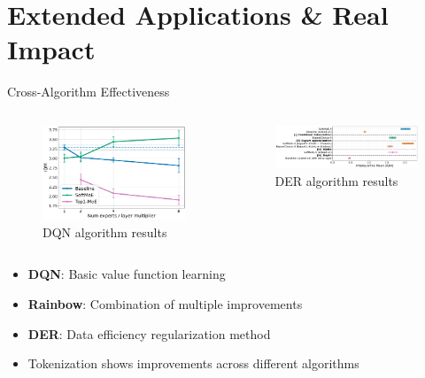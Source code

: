\documentclass{beamer}
\begin{document}
\section{Extended Applications \& Real Impact}

\begin{frame}{Cross-Algorithm Effectiveness}
  \begin{columns}[T]
    \begin{column}{0.5\textwidth}
      \begin{figure}
        \centering
        \includegraphics[width=\textwidth]{Mixtures_of_Experts_Unlock Parameter_Scaling_for_Deep_RL/figures/dqnToplinePlot.pdf}
        \caption{DQN algorithm results}
      \end{figure}
    \end{column}
    \begin{column}{0.5\textwidth}
      \begin{figure}
        \centering
        \includegraphics[width=\textwidth]{Don_t_flatten_tokenize/figures/results/section4_DER_aggregate_v2.pdf}
        \caption{DER algorithm results}
      \end{figure}
    \end{column}
  \end{columns}
  
  \begin{itemize}
    \item \textbf{DQN}: Basic value function learning
    \item \textbf{Rainbow}: Combination of multiple improvements
    \item \textbf{DER}: Data efficiency regularization method
    \item Tokenization shows improvements across different algorithms
  \end{itemize}
\end{frame}
\end{document}
